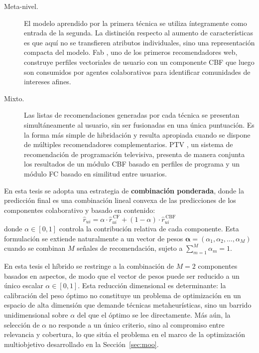 \begin{description}
	\item[Meta-nivel.] El modelo aprendido por la primera técnica se utiliza íntegramente como entrada de la segunda. La distinción respecto al aumento de características es que aquí no se transfieren atributos individuales, sino una representación compacta del modelo. Fab \citep{balabanovic_fab_1997}, uno de los primeros recomendadores web, construye perfiles vectoriales de usuario con un componente CBF que luego son consumidos por agentes colaborativos para identificar comunidades de intereses afines.

	\item[Mixto.] Las listas de recomendaciones generadas por cada técnica se presentan simultáneamente al usuario, sin ser fusionadas en una única puntuación. Es la forma más simple de hibridación y resulta apropiada cuando se dispone de múltiples recomendadores complementarios. PTV \citep{smyth_personalised_2000}, un sistema de recomendación de programación televisiva, presenta de manera conjunta los resultados de un módulo CBF basado en perfiles de programa y un módulo FC basado en similitud entre usuarios.
\end{description}

En esta tesis se adopta una estrategia de \textbf{combinación ponderada}, donde la predicción final es una combinación lineal convexa de las predicciones de los componentes colaborativo y basado en contenido:
\begin{equation} \label{eq:hybrid}
	\hat{r}_{ui} = \alpha \cdot \hat{r}_{ui}^{\,\mathrm{CF}} + (1 - \alpha) \cdot \hat{r}_{ui}^{\,\mathrm{CBF}}
\end{equation}
donde $\alpha \in [0, 1]$ controla la contribución relativa de cada componente. Esta formulación se extiende naturalmente a un vector de pesos $\boldsymbol{\alpha} = (\alpha_1, \alpha_2, \ldots, \alpha_M)$ cuando se combinan $M$ señales de recomendación, sujeto a $\sum_{m=1}^{M} \alpha_m = 1$.

En esta tesis el híbrido se restringe a la combinación de $M=2$ componentes basados en aspectos, de modo que el vector de pesos puede ser reducido a un único escalar $\alpha \in [0, 1]$. Esta reducción dimensional es determinante: la calibración del peso óptimo no constituye un problema de optimización en un espacio de alta dimensión que demande técnicas metaheurísticas, sino un barrido unidimensional sobre $\alpha$ del que el óptimo se lee directamente. Más aún, la selección de $\alpha$ no responde a un único criterio, sino al compromiso entre relevancia y cobertura, lo que sitúa el problema en el marco de la optimización multiobjetivo desarrollado en la Sección~\ref{sec:moo}.

